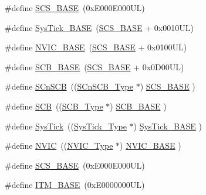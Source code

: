 \begin{DoxyCompactItemize}
\item 
\#define \hyperlink{group___c_m_s_i_s__core__base_ga3c14ed93192c8d9143322bbf77ebf770}{S\+C\+S\+\_\+\+B\+A\+SE}~(0x\+E000\+E000\+U\+L)
\item 
\#define \hyperlink{group___c_m_s_i_s__core__base_ga58effaac0b93006b756d33209e814646}{Sys\+Tick\+\_\+\+B\+A\+SE}~(\hyperlink{group___c_m_s_i_s__core__base_ga3c14ed93192c8d9143322bbf77ebf770}{S\+C\+S\+\_\+\+B\+A\+SE} +  0x0010\+U\+L)
\item 
\#define \hyperlink{group___c_m_s_i_s__core__base_gaa0288691785a5f868238e0468b39523d}{N\+V\+I\+C\+\_\+\+B\+A\+SE}~(\hyperlink{group___c_m_s_i_s__core__base_ga3c14ed93192c8d9143322bbf77ebf770}{S\+C\+S\+\_\+\+B\+A\+SE} +  0x0100\+U\+L)
\item 
\#define \hyperlink{group___c_m_s_i_s__core__base_gad55a7ddb8d4b2398b0c1cfec76c0d9fd}{S\+C\+B\+\_\+\+B\+A\+SE}~(\hyperlink{group___c_m_s_i_s__core__base_ga3c14ed93192c8d9143322bbf77ebf770}{S\+C\+S\+\_\+\+B\+A\+SE} +  0x0\+D00\+U\+L)
\item 
\#define \hyperlink{group___c_m_s_i_s__core__base_ga9fe0cd2eef83a8adad94490d9ecca63f}{S\+Cn\+S\+CB}~((\hyperlink{struct_s_cn_s_c_b___type}{S\+Cn\+S\+C\+B\+\_\+\+Type}    $\ast$)     \hyperlink{group___c_m_s_i_s__core__base_ga3c14ed93192c8d9143322bbf77ebf770}{S\+C\+S\+\_\+\+B\+A\+SE}      )
\item 
\#define \hyperlink{group___c_m_s_i_s__core__base_gaaaf6477c2bde2f00f99e3c2fd1060b01}{S\+CB}~((\hyperlink{struct_s_c_b___type}{S\+C\+B\+\_\+\+Type}       $\ast$)     \hyperlink{group___c_m_s_i_s__core__base_gad55a7ddb8d4b2398b0c1cfec76c0d9fd}{S\+C\+B\+\_\+\+B\+A\+SE}      )
\item 
\#define \hyperlink{group___c_m_s_i_s__core__base_gacd96c53beeaff8f603fcda425eb295de}{Sys\+Tick}~((\hyperlink{struct_sys_tick___type}{Sys\+Tick\+\_\+\+Type}   $\ast$)     \hyperlink{group___c_m_s_i_s__core__base_ga58effaac0b93006b756d33209e814646}{Sys\+Tick\+\_\+\+B\+A\+SE}  )
\item 
\#define \hyperlink{group___c_m_s_i_s__core__base_gac8e97e8ce56ae9f57da1363a937f8a17}{N\+V\+IC}~((\hyperlink{struct_n_v_i_c___type}{N\+V\+I\+C\+\_\+\+Type}      $\ast$)     \hyperlink{group___c_m_s_i_s__core__base_gaa0288691785a5f868238e0468b39523d}{N\+V\+I\+C\+\_\+\+B\+A\+SE}     )
\item 
\#define \hyperlink{group___c_m_s_i_s__core__base_ga3c14ed93192c8d9143322bbf77ebf770}{S\+C\+S\+\_\+\+B\+A\+SE}~(0x\+E000\+E000\+U\+L)
\item 
\#define \hyperlink{group___c_m_s_i_s__core__base_gadd76251e412a195ec0a8f47227a8359e}{I\+T\+M\+\_\+\+B\+A\+SE}~(0x\+E0000000\+U\+L)

\end{DoxyCompactItemize}

